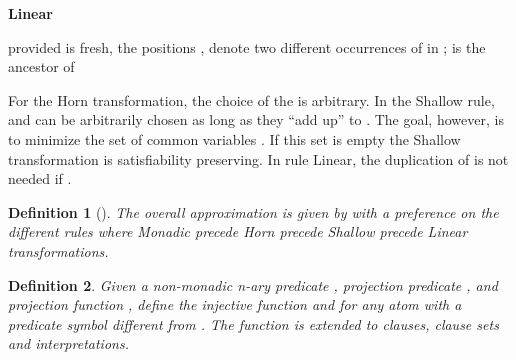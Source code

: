 \documentclass{llncs}
\newtheorem{defin}{Definition}
\newcommand{\shortrules}[6]{\noindent\begin{minipage}{#6ex}{\bfseries #1}\end{minipage}  #2  #3 \par\smallskip\noindent #4}
\begin{document}
\bigskip
\shortrules{Linear}{}{}{provided  is fresh, the positions ,  denote
two different occurrences of  in ;  is the ancestor of }{LI}{10}


\bigskip
For the Horn transformation, the choice of the  is arbitrary.
In the Shallow rule,  and  can be arbitrarily chosen as long as they ``add up'' to .
The goal, however, is to minimize the set of common variables 
.
If this set is empty the Shallow transformation is satisfiability preserving.
In rule Linear, the duplication of  is not needed if .


\begin{defin}[] \label{def:approx:trans}
The overall approximation  is given by 
with a preference on the different rules where  Monadic precede Horn precede Shallow precede Linear transformations.\\
\end{defin}


\begin{defin}
Given a non-monadic n-ary predicate , projection predicate , and projection function ,
define the injective function 
and  for any atom with a predicate symbol different from .
The function is extended to clauses, clause sets and interpretations.
\end{defin}
\end{document}
